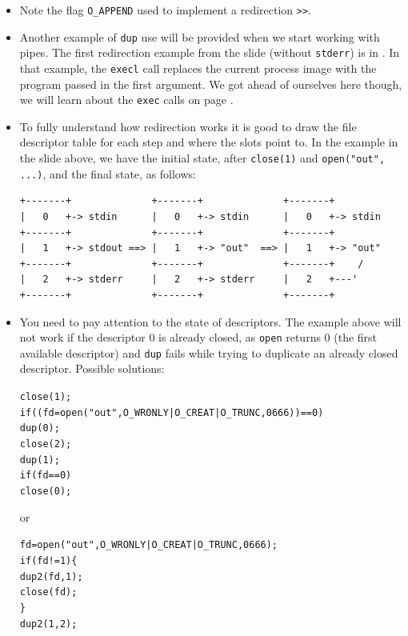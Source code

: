\begin{itemize}
\item Note the flag \texttt{O\_APPEND} used to implement a redirection
\texttt{>>}.
\item \label{REDIRECT} Another example of \texttt{dup} use will be provided when
we start working with pipes.  The first redirection example from the slide
(without \texttt{stderr}) is in .  In that example, the
\texttt{execl} call replaces the current process image with the
program passed in the first argument.  We got ahead of ourselves here though, we
will learn about the \texttt{exec} calls on page \pageref{EXEC}.
\item To fully understand how redirection works it is good to draw the file
descriptor table for each step and where the slots point to.  In 
the  example in the slide above, we have the initial state, after
\texttt{close(1)} and \texttt{open("out", ...)}, and the final state, as
follows:

\begin{verbatim}
+-------+              +-------+              +-------+
|   0   +-> stdin      |   0   +-> stdin      |   0   +-> stdin
+-------+              +-------+              +-------+
|   1   +-> stdout ==> |   1   +-> "out"  ==> |   1   +-> "out"
+-------+              +-------+              +-------+    /
|   2   +-> stderr     |   2   +-> stderr     |   2   +---' 
+-------+              +-------+              +-------+
\end{verbatim}

\item You need to pay attention to the state of descriptors. The  example
above will not work if the descriptor 0 is already closed, as 
\texttt{open} returns 0 (the first available descriptor) and \texttt{dup} fails
while trying to duplicate an already closed descriptor.  Possible
solutions:

\begin{alltt}
close(1);
if ((fd = open("out", O\_WRONLY | O\_CREAT | O\_TRUNC, 0666)) == 0)
        dup(0);
close(2);
dup(1);
if (fd == 0)
        close(0);
\end{alltt}

or

\begin{alltt}
fd = open("out", O\_WRONLY | O\_CREAT | O\_TRUNC, 0666);
if (fd != 1) \{
        dup2(fd, 1);
        close(fd);
\}
dup2(1, 2);
\end{alltt}
\end{itemize}

